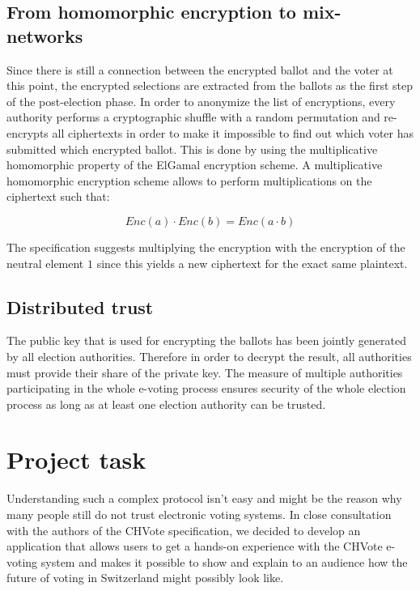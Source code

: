 \subsection{From homomorphic encryption to mix-networks}

Since there is still a connection between the encrypted ballot and the voter at this point, the encrypted selections are extracted from the ballots as the first step of the post-election phase. In order to anonymize the list of encryptions, every authority performs a cryptographic shuffle with a random permutation and re-encrypts all ciphertexts in order to make it impossible to find out which voter has submitted which encrypted ballot. This is done by using the multiplicative homomorphic property of the ElGamal encryption scheme. A multiplicative homomorphic encryption scheme allows to perform multiplications on the ciphertext such that:

\begin{equation*}Enc(a) \cdot Enc(b) = Enc(a \cdot b)\end{equation*}

The specification suggests multiplying the encryption with the encryption of the neutral element $1$ since this yields a new ciphertext for the exact same plaintext.

\subsection{Distributed trust}
The public key that is used for encrypting the ballots has been jointly generated by all election authorities. Therefore in order to decrypt the result, all authorities must provide their share of the private key. The measure of multiple authorities participating in the whole e-voting process ensures security of the whole election process as long as at least one election authority can be trusted.

\section{Project task}

Understanding such a complex protocol isn't easy and might be the reason why many people still do not trust electronic voting systems. In close consultation with the authors of the CHVote specification, we decided to develop an application that allows users to get a hands-on experience with the CHVote e-voting system and makes it possible to show and explain to an audience how the future of voting in Switzerland might possibly look like.

